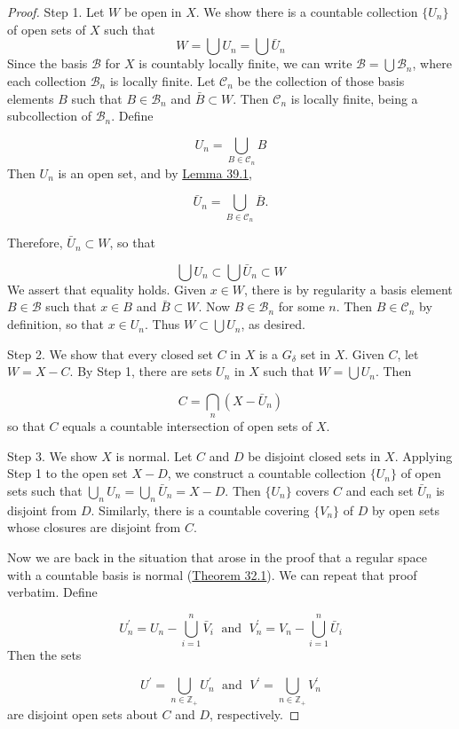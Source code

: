 \begin{proof}
 Step 1. Let \(W\) be open in \(X\). We show there is a countable collection \(\{ U_{n}\}\) of open sets of \(X\) such that
\[
W = \bigcup {U}_{n} = \bigcup {\bar{U}}_{n}
\]
Since the basis \(\mathcal{B}\) for \(X\) is countably locally finite, we can write \(\mathcal{B} = \bigcup {\mathcal{B}}_{n}\), where each collection \(\mathcal{B}_{n}\) is locally finite. Let \(\mathcal{C}_{n}\) be the collection of those basis elements \(B\) such that \(B \in {\mathcal{B}}_{n}\) and \(\bar{B} \subset W\). Then \(\mathcal{C}_{n}\) is locally finite, being a subcollection of \(\mathcal{B}_{n}\). Define

\[
U_{n} = \mathop{\bigcup }\limits_{{B \in {\mathcal{C}}_{n}}}B
\]
Then \(U_{n}\) is an open set, and by \hyperref[lem:39.1]{Lemma 39.1},

\[
\bar{U}_{n} = \mathop{\bigcup }\limits_{{B \in {\mathcal{C}}_{n}}}\bar{B}.
\]

Therefore, \(\bar{U}_{n} \subset W\), so that

\[
\bigcup {U}_{n} \subset \bigcup {\bar{U}}_{n} \subset W
\]
We assert that equality holds. Given \(x \in W\), there is by regularity a basis element \(B \in \mathcal{B}\) such that \(x \in B\) and \(\bar{B} \subset W\). Now \(B \in {\mathcal{B}}_{n}\) for some \(n\). Then \(B \in {\mathcal{C}}_{n}\) by definition, so that \(x \in {U}_{n}\). Thus \(W \subset \bigcup {U}_{n}\), as desired.

Step 2. We show that every closed set \(C\) in \(X\) is a \(G_{\delta }\) set in \(X\). Given \(C\), let \(W = X - C\). By Step 1, there are sets \(U_{n}\) in \(X\) such that \(W = \bigcup {U}_{n}\). Then

\[
C = \mathop{\bigcap }\limits_{n}({X - \bar{U}_{n}})
\]
so that \(C\) equals a countable intersection of open sets of \(X\).

Step 3. We show \(X\) is normal. Let \(C\) and \(D\) be disjoint closed sets in \(X\). Applying Step 1 to the open set \(X - D\), we construct a countable collection \(\{ U_{n}\}\) of open sets such that \(\mathop{\bigcup }\limits_{n}U_{n} = \mathop{\bigcup }\limits_{n}\bar{U}_{n} = X - D\). Then \(\{ U_{n}\}\) covers \(C\) and each set \(\bar{U}_{n}\) is disjoint from \(D\). Similarly, there is a countable covering \(\{ V_{n}\}\) of \(D\) by open sets whose closures are disjoint from \(C\).

Now we are back in the situation that arose in the proof that a regular space with a countable basis is normal (\hyperref[thm:32.1]{Theorem 32.1}). We can repeat that proof verbatim. Define

\[
U_n^{\prime } = U_{n} - \mathop{\bigcup }\limits_{{i = 1}}^{n}\bar{V}_{i}\;\text{ and }\;V_n^{\prime } = V_{n} - \mathop{\bigcup }\limits_{{i = 1}}^{n}\bar{U}_{i}
\]
Then the sets

\[
U^{\prime } = \mathop{\bigcup }\limits_{{n \in {\mathbb{Z}}_{ + }}}U_n^{\prime }\;\text{ and }\;V^{\prime } = \mathop{\bigcup }\limits_{{n \in {\mathbb{Z}}_{ + }}}V_n^{\prime }
\]
are disjoint open sets about \(C\) and \(D\), respectively.
\end{proof}
